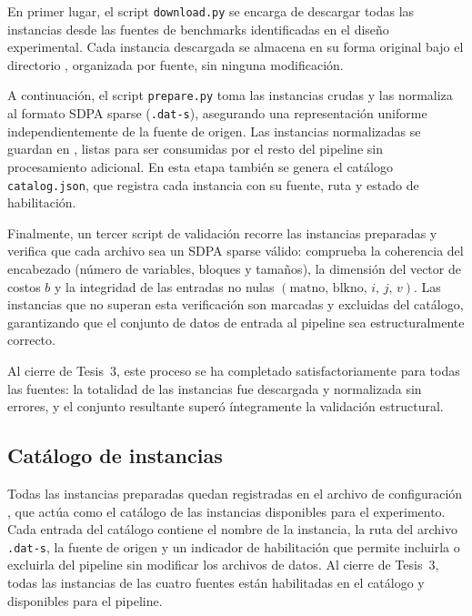 En primer lugar, el script \texttt{download.py} se encarga de descargar todas las
instancias desde las fuentes de benchmarks identificadas en el diseño experimental.
Cada instancia descargada se almacena en su forma original bajo el directorio
, organizada por fuente, sin ninguna modificación.

A continuación, el script \texttt{prepare.py} toma las instancias crudas y las
normaliza al formato SDPA sparse (\texttt{.dat-s}), asegurando una representación
uniforme independientemente de la fuente de origen.
Las instancias normalizadas se guardan en ,
listas para ser consumidas por el resto del pipeline sin procesamiento adicional.
En esta etapa también se genera el catálogo \texttt{catalog.json}, que registra
cada instancia con su fuente, ruta y estado de habilitación.

Finalmente, un tercer script de validación recorre las instancias preparadas y
verifica que cada archivo sea un SDPA sparse válido: comprueba la coherencia del
encabezado (número de variables, bloques y tamaños), la dimensión del vector de
costos $b$ y la integridad de las entradas no nulas
$(\text{matno},\,\text{blkno},\,i,\,j,\,v)$.
Las instancias que no superan esta verificación son marcadas y excluidas del
catálogo, garantizando que el conjunto de datos de entrada al pipeline sea
estructuralmente correcto.

Al cierre de Tesis~3, este proceso se ha completado satisfactoriamente para todas
las fuentes: la totalidad de las instancias fue descargada y normalizada sin errores,
y el conjunto resultante superó íntegramente la validación estructural.


\subsection{Catálogo de instancias}
\label{subsec:avance_catalogo}

Todas las instancias preparadas quedan registradas en el archivo de configuración
, que actúa como el catálogo de las instancias
disponibles para el experimento.
Cada entrada del catálogo contiene el nombre de la instancia, la ruta del archivo
\texttt{.dat-s}, la fuente de origen y un indicador de habilitación que permite incluirla
o excluirla del pipeline sin modificar los archivos de datos.
Al cierre de Tesis~3, todas las instancias de las cuatro fuentes están habilitadas
en el catálogo y disponibles para el pipeline.

